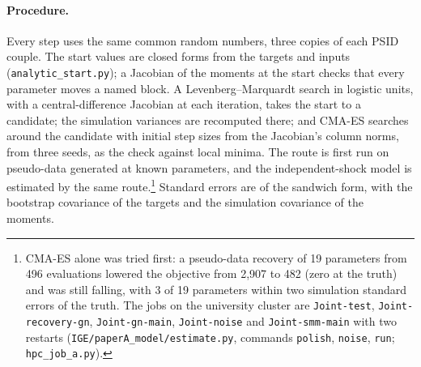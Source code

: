 \paragraph{Procedure.} Every step uses the same common random numbers, three copies of each PSID couple. The start
values are closed forms from the targets and inputs (\texttt{analytic\_start.py}); a Jacobian of the moments at the
start checks that every parameter moves a named block. A Levenberg--Marquardt search in logistic units, with a
central-difference Jacobian at each iteration, takes the start to a candidate; the simulation variances are recomputed
there; and CMA-ES searches around the candidate with initial step sizes from the Jacobian's column norms, from three
seeds, as the check against local minima. The route is first run on pseudo-data generated at known parameters, and the
independent-shock model is estimated by the same route.\footnote{CMA-ES alone was tried first: a pseudo-data recovery
of 19 parameters from 496 evaluations lowered the objective from 2{,}907 to 482 (zero at the truth) and was still
falling, with 3 of 19 parameters within two simulation standard errors of the truth. The jobs on the university
cluster are \texttt{Joint-test}, \texttt{Joint-recovery-gn}, \texttt{Joint-gn-main}, \texttt{Joint-noise} and
\texttt{Joint-smm-main} with two restarts (\texttt{IGE/paperA\_model/estimate.py}, commands \texttt{polish},
\texttt{noise}, \texttt{run}; \texttt{hpc\_job\_a.py}).} Standard errors are of the sandwich form, with the bootstrap
covariance of the targets and the simulation covariance of the moments.

